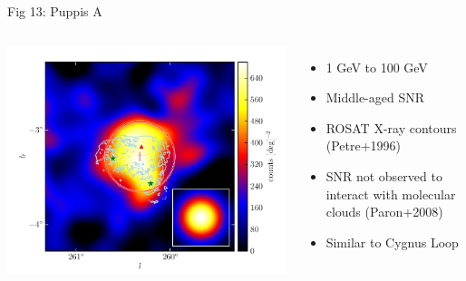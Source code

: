 \documentclass[12pt]{beamer}
\begin{document}
\begin{frame}{Fig 13: Puppis A}

  \begin{columns}
    \includegraphics[scale=0.50]{plots/source_Puppis_A_color.pdf}

    \begin{itemize}
    \item 1 GeV to 100 GeV
      \item Middle-aged SNR
      \item ROSAT X-ray contours (Petre+1996)
      \item SNR not observed to interact with
      molecular clouds (Paron+2008)
      \item Similar to Cygnus Loop
      \end{itemize}
  \end{columns}
\end{frame}
\end{document}
